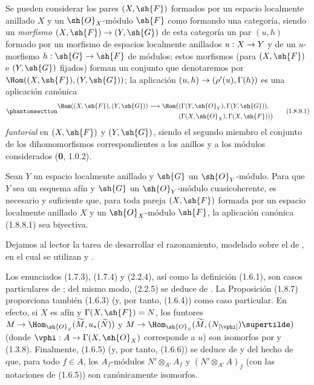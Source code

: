 \documentclass[oneside,10pt]{amsart}
\makeatletter
\newcommand{\ega@arrow}[2]{\mathchoice{#1}{#2}{#2}{#2}}
\renewcommand{\to}{\ega@arrow{\longrightarrow}{\rightarrow}}
\newcommand{\oldpage}[2][]{\marginnote{\normalfont\footnotesize\textbf{#1}~|~#2}\ignorespaces}
\let\EGAOriginalLabel\label
\renewcommand{\label}[1]{\phantomsection\EGAOriginalLabel{#1}}
\makeatother
\begin{document}
\begin{env}[1.8.9]
\label{ega2:addendum:I.1.8.9-fr}
Se pueden considerar los pares $(X,\sh{F})$ formados por un espacio localmente anillado $X$ y un $\sh{O}_X$-módulo $\sh{F}$ como formando una categoría, siendo un \emph{morfismo} $(X,\sh{F})\to(Y,\sh{G})$ de esta categoría un par $(u,h)$ formado por un morfismo de
\oldpage[II]{221}
espacios localmente anillados $u:X\to Y$ y de un $u$-morfismo
$h:\sh{G}\to\sh{F}$ de módulos; estos
morfismos (para $(X,\sh{F})$ e $(Y,\sh{G})$ fijados) forman un conjunto
que denotaremos por $\Hom((X,\sh{F}),(Y,\sh{G}))$; la aplicación
$(u,h)\to(\rho'(u),\Gamma(h))$ es una aplicación canónica
\begin{equation}
\label{ega2:addendum:I.1.8.9.1-fr}
\begin{split}
  \Hom((X,\sh{F}),(Y,\sh{G}))\to
  \Hom\bigl(
    &(\Gamma(Y,\sh{O}_Y),\Gamma(Y,\sh{G})),\\
    &(\Gamma(X,\sh{O}_X),\Gamma(X,\sh{F}))
  \bigr)
\end{split}
\tag{1.8.9.1}
\end{equation}
\emph{funtorial} en $(X,\sh{F})$ y $(Y,\sh{G})$, siendo el segundo miembro
el conjunto de los dihomomorfismos correspondientes a los anillos y a
los módulos considerados (\textbf 0, 1.0.2).
\end{env}

\begin{corollary}[1.8.10]
\label{ega2:addendum:I.1.8.10-fr}
Sean $Y$ un espacio localmente anillado y $\sh{G}$ un
$\sh{O}_Y$-módulo. Para que $Y$ sea un esquema afín y $\sh{G}$ un
$\sh{O}_Y$-módulo cuasicoherente, es necesario y suficiente que, para
toda pareja $(X,\sh{F})$ formada por un espacio localmente anillado $X$
y un $\sh{O}_X$-módulo $\sh{F}$, la aplicación canónica \textup{(1.8.8.1)} sea
biyectiva.
\end{corollary}

Dejamos al lector la tarea de desarrollar el razonamiento, modelado
sobre el de , en el cual se utilizan  y
.

\begin{remark}[1.8.11]
\label{ega2:addendum:I.1.8.11-fr}
Los enunciados (1.7.3), (1.7.4) y (2.2.4), así como la
definición (1.6.1), son casos particulares de ; del
mismo modo, (2.2.5) se deduce de . La Proposición
(1.8.7) proporciona también (1.6.3) (y, por tanto, (1.6.4)) como
caso particular. En efecto, si $X$ es afín y $\Gamma(X,\sh{F})=N$, los
funtores
$M\to
  \Hom_{\sh{O}_S}(\widetilde M,u_*(\widetilde N))$ y $M\to
  \Hom_{\sh{O}_S}(\widetilde M,(N_{[\vphi]})\supertilde)$
(donde $\vphi:A\to\Gamma(X,\sh{O}_X)$ corresponde a $u$) son
isomorfos por  y (1.3.8). Finalmente, (1.6.5) (y,
por tanto, (1.6.6)) se deduce de  y del hecho de que,
para todo $f\in A$, los $A_f$-módulos
$N'\otimes_{A'}A_f$ y $(N'\otimes_{A'}A)_f$
(con las notaciones de (1.6.5)) son canónicamente isomorfos.
\end{remark}
\end{document}
